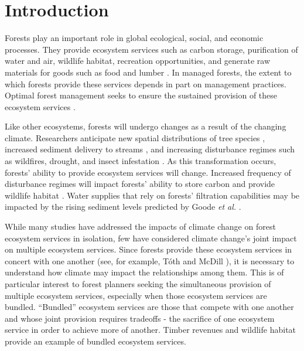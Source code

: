
\section{Introduction}
\label{sec:intro}
 
Forests play an important role in global ecological, social, and economic processes. They provide ecosystem services such as carbon storage, purification of water and air, wildlife habitat, recreation opportunities, and generate raw materials for goods such as food and lumber \cite{daily1997ecosystem}. In managed forests, the extent to which forests provide these services depends in part on management practices. Optimal forest management seeks to ensure the sustained provision of these ecosystem services \cite{cfrForestMgmt}.

Like other ecosystems, forests will undergo changes as a result of the changing climate. Researchers anticipate new spatial distributions of tree species \cite{iverson1998predicting}, increased sediment delivery to streams \cite{Goode20121}, and increasing disturbance regimes such as wildfires, drought, and insect infestation \cite{vose2012effects}. As this transformation occurs, forests' ability to provide ecosystem services will change. Increased frequency of disturbance regimes will impact forests' ability to store carbon \cite{bonan2008forests} and provide wildlife habitat \cite{mckenzie2004climatic}. Water supplies that rely on forests' filtration capabilities may be impacted by the rising sediment levels predicted by Goode \textit{et al.} \cite{Goode20121}.

While many studies have addressed the impacts of climate change on forest ecosystem services in isolation\cite{vose2012effects}\cite{bonan2008forests}\cite{mckenzie2004climatic}, few have considered climate change's joint impact on multiple ecosystem services. Since forests provide these ecosystem services in concert with one another (see, for example, T{\'o}th and McDill \cite{toth2009finding}), it is necessary to understand how climate may impact the relationships among them. This is of particular interest to forest planners seeking the simultaneous provision of multiple ecosystem services, especially when those ecosystem services are bundled. ``Bundled'' ecosystem services are those that compete with one another and whose joint provision requires tradeoffs - the sacrifice of one ecosystem service in order to achieve more of another. Timber revenues and wildlife habitat provide an example of bundled ecosystem services.%

